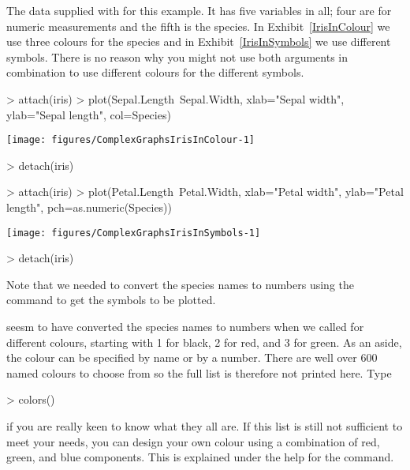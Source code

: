 The  data supplied with \R{} for this example. It has five variables in all; four are for numeric measurements and the fifth is the species. In Exhibit~\ref{IrisInColour} we use three colours for the species and in Exhibit~\ref{IrisInSymbols} we use different symbols. There is no reason why you might not use both arguments in combination to use different colours for the different symbols.

\begin{exhibit}
\begin{center}
\caption{}
\label{IrisInColour}
\begin{Schunk}
\begin{Sinput}
> attach(iris)
> plot(Sepal.Length~Sepal.Width, xlab="Sepal width", ylab="Sepal length", col=Species)
\end{Sinput}

\texttt{[image: figures/ComplexGraphsIrisInColour-1]} \begin{Sinput}
> detach(iris)
\end{Sinput}
\end{Schunk}
\end{center}
\end{exhibit}

\begin{exhibit}
\begin{center}
\caption{}
\label{IrisInSymbols}
\begin{Schunk}
\begin{Sinput}
> attach(iris)
> plot(Petal.Length~Petal.Width, xlab="Petal width", ylab="Petal length", pch=as.numeric(Species))
\end{Sinput}

\texttt{[image: figures/ComplexGraphsIrisInSymbols-1]} \begin{Sinput}
> detach(iris)
\end{Sinput}
\end{Schunk}
\end{center}
\end{exhibit}
Note that we needed to convert the species names to numbers using the  command to get the symbols to be plotted.

\R{} seesm to have converted the species names to numbers when we called for different colours, starting with 1 for black, 2 for red, and 3 for green. As an aside, the colour can be specified by name or by a number. There are well over 600 named colours to choose from so the full list is therefore not printed here. Type
\begin{Schunk}
\begin{Sinput}
> colors()
\end{Sinput}
\end{Schunk}
if you are really keen to know what they all are. If this list is still not sufficient to meet your needs, you can design your own colour using a combination of red, green, and blue components. This is explained under the help for the  command.


